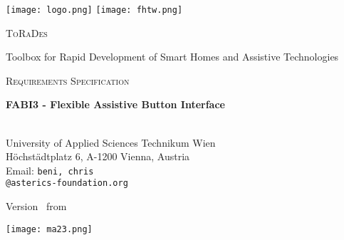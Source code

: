 \documentclass[]{scrreprt}%
\newcommand{\docTitle}{FABI3 - Flexible Assistive Button Interface}
\newcommand{\BAEmail}{beni}
\newcommand{\CVEmail}{chris}
\begin{document}
% 
% 
% 

\begin{titlepage}
	
	\texttt{[image: logo.png]} \hfill
	\texttt{[image: fhtw.png]}
	
	\centering
	\par\vspace{1cm}
	{\scshape\Huge ToRaDes \normalsize \par Toolbox for Rapid Development of Smart Homes and Assistive Technologies \par}
	\vspace{1cm}
	{\scshape\Large Requirements Specification\par}
	\vspace{1.5cm}
	{\huge\bfseries \docTitle \par}
	\vspace{2cm}
	{\Large
	\vhListAllAuthorsLongWithAbbrev \\{University of Applied Sciences Technikum Wien}
	\\{H\"ochst\"adtplatz 6, A-1200 Vienna, Austria}
	\\{Email: {\texttt{\BAEmail, \CVEmail}}}
	\\{\texttt{@asterics-foundation.org}}
	\par}
	\vfill
	{\large Version \vhCurrentVersion\ from \vhCurrentDate \par}
	\begin{flushright}
	 \texttt{[image: ma23.png]}
	\end{flushright}
\end{titlepage}

\end{document}
